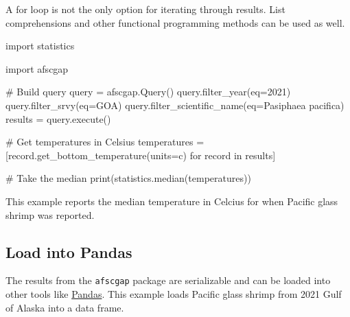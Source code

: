 \documentclass[
  letterpaper,
  oneside,
  open=any]{scrbook}
\newenvironment{Shaded}{\begin{snugshade}}{\end{snugshade}}
\newcommand{\AttributeTok}[1]{\textcolor[rgb]{0.40,0.45,0.13}{#1}}
\newcommand{\CommentTok}[1]{\textcolor[rgb]{0.37,0.37,0.37}{#1}}
\newcommand{\ControlFlowTok}[1]{\textcolor[rgb]{0.00,0.23,0.31}{#1}}
\newcommand{\DecValTok}[1]{\textcolor[rgb]{0.68,0.00,0.00}{#1}}
\newcommand{\FunctionTok}[1]{\textcolor[rgb]{0.28,0.35,0.67}{#1}}
\newcommand{\NormalTok}[1]{\textcolor[rgb]{0.00,0.23,0.31}{#1}}
\newcommand{\OtherTok}[1]{\textcolor[rgb]{0.00,0.23,0.31}{#1}}
\newcommand{\StringTok}[1]{\textcolor[rgb]{0.13,0.47,0.30}{#1}}
\begin{document}
A for loop is not the only option for iterating through results. List
comprehensions and other functional programming methods can be used as
well.

\begin{Shaded}
\begin{Highlighting}[]
\NormalTok{import statistics}

\NormalTok{import afscgap}

\CommentTok{\# Build query}
\NormalTok{query }\OtherTok{=} \FunctionTok{afscgap.Query}\NormalTok{()}
\FunctionTok{query.filter\_year}\NormalTok{(}\AttributeTok{eq=}\DecValTok{2021}\NormalTok{)}
\FunctionTok{query.filter\_srvy}\NormalTok{(}\AttributeTok{eq=}\StringTok{\textquotesingle{}GOA\textquotesingle{}}\NormalTok{)}
\FunctionTok{query.filter\_scientific\_name}\NormalTok{(}\AttributeTok{eq=}\StringTok{\textquotesingle{}Pasiphaea pacifica\textquotesingle{}}\NormalTok{)}
\NormalTok{results }\OtherTok{=} \FunctionTok{query.execute}\NormalTok{()}

\CommentTok{\# Get temperatures in Celsius}
\NormalTok{temperatures }\OtherTok{=}\NormalTok{ [}\FunctionTok{record.get\_bottom\_temperature}\NormalTok{(}\AttributeTok{units=}\StringTok{\textquotesingle{}c\textquotesingle{}}\NormalTok{) }\ControlFlowTok{for}\NormalTok{ record }\ControlFlowTok{in}\NormalTok{ results]}

\CommentTok{\# Take the median}
\FunctionTok{print}\NormalTok{(}\FunctionTok{statistics.median}\NormalTok{(temperatures))}
\end{Highlighting}
\end{Shaded}

This example reports the median temperature in Celcius for when Pacific
glass shrimp was reported.

\hypertarget{load-into-pandas}{%
\subsection{Load into Pandas}\label{load-into-pandas}}

The results from the \texttt{afscgap} package are serializable and can
be loaded into other tools like
\href{https://pandas.pydata.org/}{Pandas}. This example loads Pacific
glass shrimp from 2021 Gulf of Alaska into a data frame.
\end{document}
